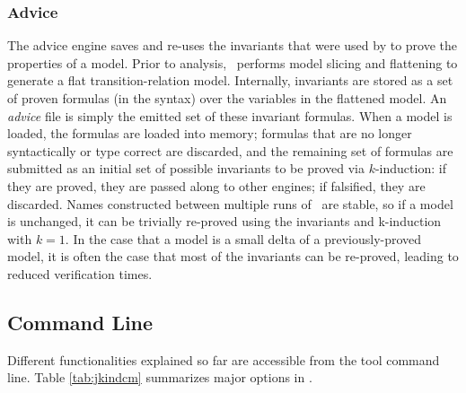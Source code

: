 \subsubsection{Advice}

The advice engine saves and re-uses the invariants that were used by \jkind to prove the properties of a model.  Prior to analysis, \jkind\ performs model slicing and flattening to generate a flat transition-relation model.  Internally, invariants are stored as a set of proven formulas (in the \lustre syntax) over the variables in the flattened model.  An {\em advice} file is simply the emitted set of these invariant formulas.  When a model is loaded, the formulas are loaded into memory; formulas that are no longer syntactically or type correct are discarded, and the remaining set of formulas are submitted as an initial set of possible invariants to be proved via $k$-induction: if they are proved, they are passed along to other engines; if falsified, they are discarded.
%
Names constructed between multiple runs of \jkind\ are stable, so if a model is unchanged, it can be trivially re-proved using the invariants and k-induction with $k=1$.  In the case that a model is a small delta of a previously-proved model, it is often the case that most of the invariants can be re-proved, leading to reduced verification times.

\subsection{Command Line}
Different \jkind functionalities explained so far are accessible from the tool command line. Table \ref{tab:jkindcm} summarizes major options in \jkind.

